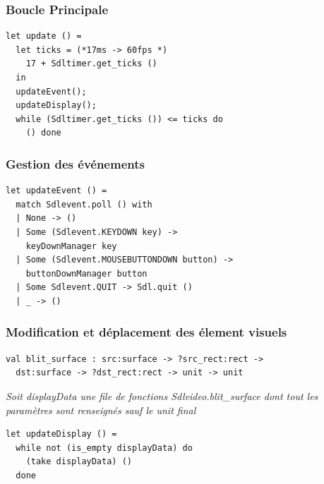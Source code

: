 \begin{frame}[fragile]
	\frametitle{Boucle Principale}
	\begin{lstlisting}
let update () =
  let ticks = (*17ms -> 60fps *) 
    17 + Sdltimer.get_ticks () 
  in
  updateEvent();
  updateDisplay();
  while (Sdltimer.get_ticks ()) <= ticks do 
    () done
	\end{lstlisting}
\end{frame}

\begin{frame}[fragile]
	\frametitle{Gestion des événements}
	\begin{lstlisting}
let updateEvent () = 
  match Sdlevent.poll () with
  | None -> ()
  | Some (Sdlevent.KEYDOWN key) -> 
    keyDownManager key
  | Some (Sdlevent.MOUSEBUTTONDOWN button) -> 
    buttonDownManager button
  | Some Sdlevent.QUIT -> Sdl.quit ()
  | _ -> ()
	\end{lstlisting}
\end{frame}

\begin{frame}[fragile]
	\frametitle{Modification et déplacement des élement visuels}
	\lstset{basicstyle=\scriptsize}
	\begin{lstlisting}
val blit_surface : src:surface -> ?src_rect:rect -> 
  dst:surface -> ?dst_rect:rect -> unit -> unit
	\end{lstlisting}
	\textit{Soit displayData une file de fonctions Sdlvideo.blit\_surface dont tout les paramètres sont renseignés sauf le unit final}
	\lstset{basicstyle=\normalsize}
	\begin{lstlisting}
let updateDisplay () = 
  while not (is_empty displayData) do
    (take displayData) ()
  done
	\end{lstlisting}
\end{frame}
